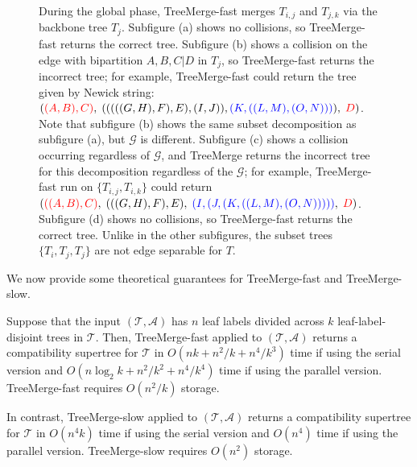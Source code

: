 \begin{figure}[!h]
{During the global phase, TreeMerge-fast merges $T_{i,j}$ and $T_{j,k}$ via the backbone tree $T_j$. 
Subfigure (a) shows no collisions, so TreeMerge-fast returns the correct tree.
Subfigure (b) shows a collision on the edge with bipartition $A,B,C|D$ in $T_j$, so TreeMerge-fast returns the incorrect tree; for example, TreeMerge-fast could return the tree given by Newick string: ${(\color{red} (A,B),C)},\;(((((G,H),F),E),(I,J)),{\color{blue}(K,((L,M),(O,N)))}),\;{\color{red} D})$.
Note that subfigure (b) shows the same subset decomposition as subfigure (a), but $\mathcal{G}$ is different.
Subfigure (c) shows a collision occurring regardless of $\mathcal{G}$, and TreeMerge returns the incorrect tree for this decomposition regardless of the $\mathcal{G}$; for example, TreeMerge-fast run on $\{ T_{i,j}, T_{i,k} \}$ could return ${(\color{red} ((A,B),C)},\; (((G,H),F),E),\; {\color{blue} (I,(J,(K,((L,M),(O,N)))))}, \; {\color{red} D})$.
Subfigure (d) shows no collisions, so TreeMerge-fast returns the correct tree. Unlike in the other subfigures, the subset trees $\{ T_i, T_j, T_j\}$ are not edge separable for $T$.
 }
\label{fig:collisions}
\end{figure}

\clearpage

We now provide some theoretical guarantees for TreeMerge-fast and TreeMerge-slow.

\begin{theorem}
\label{thm:treemerge-rt}
Suppose that the input $(\mathcal{T}, \mathcal{A})$ has $n$ leaf labels divided across $k$ leaf-label-disjoint trees in $\mathcal{T}$.
Then, TreeMerge-fast applied to $(\mathcal{T}, \mathcal{A})$ returns a compatibility supertree for $\mathcal{T}$ in 
 $O(nk + n^2/k + n^4/k^3)$ time if using the serial version and $O(n \log_2{k} + n^2/k^2 + n^4/k^4)$ time if using the parallel version.
TreeMerge-fast requires $O(n^2 / k)$ storage.

In contrast, TreeMerge-slow applied to $(\mathcal{T}, \mathcal{A})$ returns a compatibility supertree for $\mathcal{T}$ in $O(n^4k)$ time if using the serial version and $O(n^4)$ time if using the parallel version.
TreeMerge-slow requires $O(n^2)$ storage.
\end{theorem}

